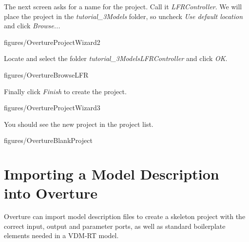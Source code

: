 \documentclass[11pt,a4paper]{../tutorial}
\begin{document}
\begin{instructions}
\item The next screen asks for a name for the project. Call it \emph{LFRController}. We will place the project in the \emph{tutorial\_3\pathsep{}Models} folder, so uncheck \emph{Use default location} and click \emph{Browse...}

    \begin{annotation}[width=0.6\linewidth]{figures/OvertureProjectWizard2}
    \end{annotation}

\newpage
\item Locate and select the folder \emph{tutorial\_3\pathsep{}Models\pathsep{}LFRController} and click \emph{OK}.

    \begin{annotation}[width=0.55\linewidth]{figures/OvertureBrowseLFR}
    \end{annotation}

\item Finally click \emph{Finish} to create the project.

    \begin{annotation}[width=0.6\linewidth]{figures/OvertureProjectWizard3}
    \end{annotation}

    You should see the new project in the project list.

    \begin{annotation}[width=\linewidth,trim=0 400 0 0,clip]{figures/OvertureBlankProject}
    \end{annotation}

\end{instructions}

\section{Importing a Model Description into Overture}

Overture can import model description files to create a skeleton project with the correct input, output and parameter ports, as well as standard boilerplate elements needed in a VDM-RT model.
\end{document}
